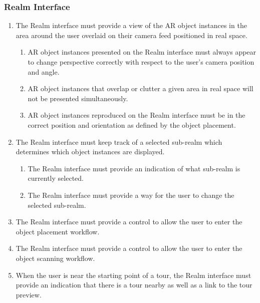 \documentclass{article}
\begin{document}
\subsubsection{Realm Interface}
\label{ssub:realm_interface}

\begin{enumerate}[align=left, label=\textbf{RI-FR\arabic*:}]
    \item The Realm interface must provide a view of the AR object instances in the area around the user overlaid on their camera feed positioned in real space.
    \begin{enumerate}[align=left, label=\textbf{RI-FR1.\arabic*:}]
        \item AR object instances presented on the Realm interface must always appear to change perspective correctly with respect to the user’s camera position and angle.
        \item AR object instances that overlap or clutter a given area in real space will not be presented simultaneously.
        \item AR object instances reproduced on the Realm interface must be in the correct position and orientation as defined by the object placement.
    \end{enumerate}
    
    \item The Realm interface must keep track of a selected sub-realm which determines which object instances are displayed.
    \begin{enumerate}[align=left, label=\textbf{RI-FR2.\arabic*:}]
        \item The Realm interface must provide an indication of what sub-realm is currently selected.
        \item The Realm interface must provide a way for the user to change the selected sub-realm.
    \end{enumerate}
    
    \item The Realm interface must provide a control to allow the user to enter the object placement workflow. 
    \item The Realm interface must provide a control to allow the user to enter the object scanning workflow.
    \item When the user is near the starting point of a tour, the Realm interface must provide an indication that there is a tour nearby as well as a link to the tour preview.
\end{enumerate}
\end{document}
